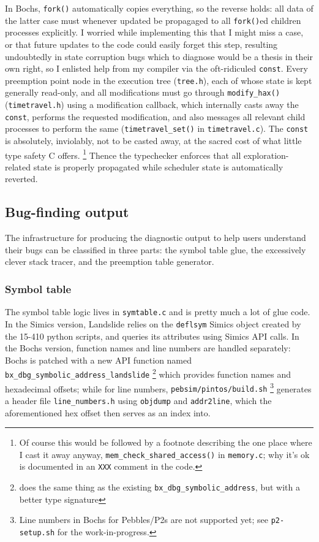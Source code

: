 In Bochs, {\tt fork()} automatically copies everything, so the reverse holds:
all data of the latter case must whenever updated be propagaged to all {\tt fork()}ed children processes explicitly.
I worried while implementing this that I might miss a case, or that future updates to the code could easily forget this step,
resulting undoubtedly in state corruption bugs which to diagnose would be a thesis in their own right,
so I enlisted help from my compiler via the oft-ridiculed {\tt const}.
Every preemption point node in the execution tree ({\tt tree.h}),
each of whose state is kept generally read-only,
and all modifications must go through {\tt modify\_hax()} ({\tt timetravel.h}) using a modification callback,
which internally casts away the {\tt const}, performs the requested modification,
and also messages all relevant child processes to perform the same ({\tt timetravel\_set()} in {\tt timetravel.c}).
The {\tt const} is absolutely, inviolably, not to be casted away, at the sacred cost of what little type safety C offers.%
\footnote{Of course this would be followed by a footnote describing the one place where I cast it away anyway,
{\tt mem\_check\_shared\_access()} in {\tt memory.c};
why it's ok is documented in an {\tt XXX} comment in the code.}
Thence the typechecker enforces that all exploration-related state is properly propagated while scheduler state is automatically reverted.


\subsection{Bug-finding output}
\label{sec:landslide-foundabug}

The infrastructure for producing the diagnostic output to help users understand their bugs
can be classified in three parts:
the symbol table glue, the excessively clever stack tracer, and the preemption table generator.

\subsubsection{Symbol table}

The symbol table logic lives in {\tt symtable.c} and is pretty much a lot of glue code.
In the Simics version, Landslide relies on the {\tt deflsym} Simics object created by the 15-410 python scripts,
and queries its attributes using Simics API calls.
In the Bochs version, function names and line numbers are handled separately:
Bochs is patched with a new API function named {\tt bx\_dbg\_symbolic\_address\_landslide}%
\footnote{does the same thing as the existing {\tt bx\_dbg\_symbolic\_address}, but with a better type signature}
which provides function names and hexadecimal offsets;
while for line numbers, {\tt pebsim/pintos/build.sh}%
\footnote{Line numbers in Bochs for Pebbles/P2s are not supported yet; see {\tt p2-setup.sh} for the work-in-progress.}
generates a header file {\tt line\_numbers.h}
using {\tt objdump} and {\tt addr2line},
which the aforementioned hex offset then serves as an index into.

